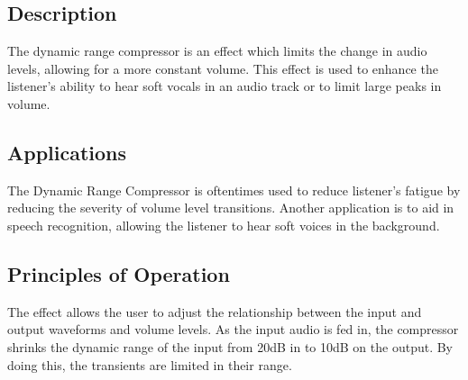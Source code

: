 \subsection{Description}
The dynamic range compressor is an effect which limits the change in audio levels, allowing for a more constant volume. This effect is used to enhance the listener's ability to hear soft vocals in an audio track or to limit large peaks in volume.

\subsection{Applications}
The Dynamic Range Compressor is oftentimes used to reduce listener's fatigue by reducing the severity of volume level transitions. Another application is to aid in speech recognition, allowing the listener to hear soft voices in the background.

\subsection{Principles of Operation}
The effect allows the user to adjust the relationship between the input and output waveforms and volume levels. As the input audio is fed in, the compressor shrinks the dynamic range of the input from 20dB in to 10dB on the output. By doing this, the transients are limited in their range.

